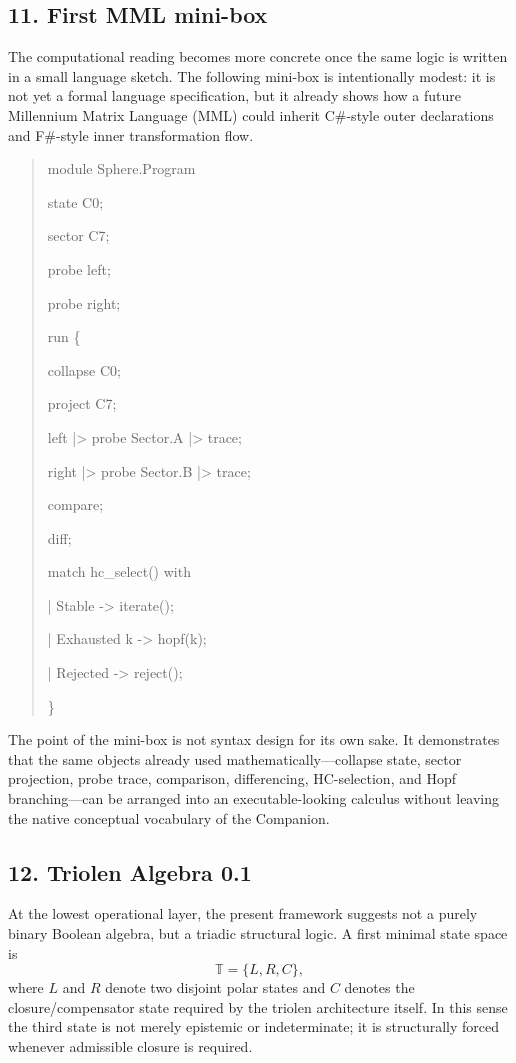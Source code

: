 \subsection*{11. First MML mini-box}
The computational reading becomes more concrete once the same logic is written in a small language sketch. The following mini-box is intentionally modest: it is not yet a formal language specification, but it already shows how a future Millennium Matrix Language (MML) could inherit C\#-style outer declarations and F\#-style inner transformation flow.

\begin{quote}
\ttfamily
module Sphere.Program\par
state C0;\par
sector C7;\par
probe left;\par
probe right;\par
\par
run \{\par
\quad collapse C0;\par
\quad project C7;\par
\quad left  |> probe Sector.A |> trace;\par
\quad right |> probe Sector.B |> trace;\par
\quad compare;\par
\quad diff;\par
\quad match hc\_select() with\par
\quad | Stable      -> iterate();\par
\quad | Exhausted k -> hopf(k);\par
\quad | Rejected    -> reject();\par
\}\par
\end{quote}

The point of the mini-box is not syntax design for its own sake. It demonstrates that the same objects already used mathematically---collapse state, sector projection, probe trace, comparison, differencing, HC-selection, and Hopf branching---can be arranged into an executable-looking calculus without leaving the native conceptual vocabulary of the Companion.

\subsection*{12. Triolen Algebra 0.1}
At the lowest operational layer, the present framework suggests not a purely binary Boolean algebra, but a triadic structural logic. A first minimal state space is
\[
\mathbb T=\{L,R,C\},
\]
where $L$ and $R$ denote two disjoint polar states and $C$ denotes the closure/compensator state required by the triolen architecture itself. In this sense the third state is not merely epistemic or indeterminate; it is structurally forced whenever admissible closure is required.

